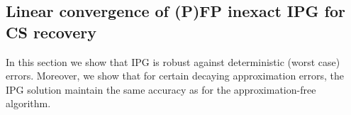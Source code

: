 






	
	
	
	

\subsection{Linear convergence of (P)FP inexact IPG for CS recovery}
In this section we show that IPG is robust against deterministic (worst case) errors. Moreover, we show that for certain decaying approximation errors, the IPG solution maintain  the same accuracy as for the approximation-free  algorithm. %

{} 

